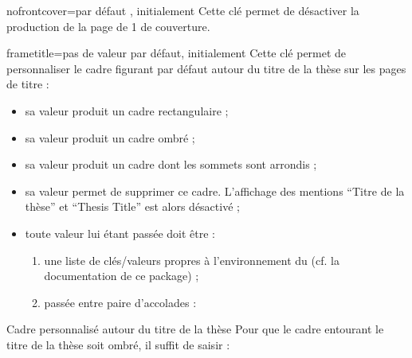 \begin{docKey}{nofrontcover}{=\textbar{}}{par défaut
    , initialement }%
  Cette clé permet de désactiver la production de la page de 1\iere{} de
  couverture.
\end{docKey}

{%
\begin{docKey}{frametitle}{=\textbar{}\textbar{}\textbar{}\textbar{}}{pas de valeur par défaut, initialement }
  Cette clé permet de personnaliser le cadre figurant par défaut autour du
  titre de la thèse sur les pages de titre :
  \begin{itemize}
  \item sa valeur  produit un cadre rectangulaire ;
  \item sa valeur  produit un cadre ombré ;
  \item sa valeur  produit un cadre dont les sommets sont
    arrondis ;
  \item sa valeur  permet de supprimer ce cadre. L'affichage des
    mentions \enquote{Titre de la thèse} et \foreignquote{english}{Thesis
      Title} est alors désactivé ;
  \item toute  valeur lui étant passée doit être :
    \begin{enumerate}
    \item une liste de clés/valeurs propres à l'environnement
       du  (cf. la
      documentation de ce package) ;
    \item passée entre paire d'accolades :
\begin{preamblecode}
\end{preamblecode}
    \end{enumerate}
  \end{itemize}
\end{docKey}
}

\begin{dbexample}{Cadre personnalisé autour du titre de la thèse}{}
  Pour que le cadre entourant le titre de la thèse soit ombré, il suffit de
  saisir :
\begin{preamblecode}
\maketitle[frametitle=shadowbox]
\end{preamblecode}
\end{dbexample}

